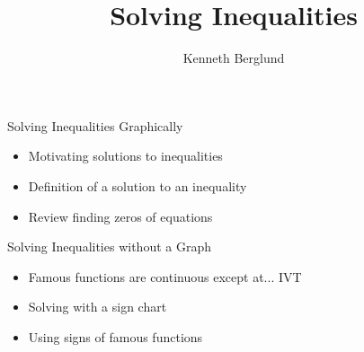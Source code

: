 \documentclass{ximera}
\author{Kenneth Berglund}
\title{Solving Inequalities}
\begin{document}
\begin{abstract}
\end{abstract}
\maketitle


\begin{objectives}
\item Solving Inequalities Graphically
\begin{itemize}
	\item Motivating solutions to inequalities
	\item Definition of a solution to an inequality
	\item Review finding zeros of equations
\end{itemize}

\item Solving Inequalities without a Graph
\begin{itemize}
	\item Famous functions are continuous except at... IVT
	\item Solving with a sign chart
	\item Using signs of famous functions
\end{itemize}


\end{objectives}
\end{document}
